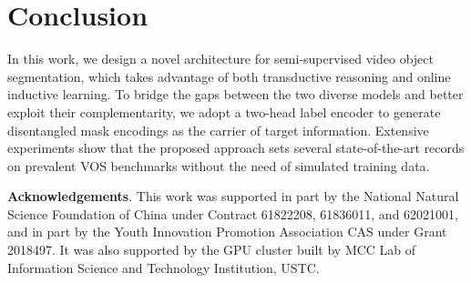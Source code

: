 \documentclass[10pt,twocolumn,letterpaper]{article}
\begin{document}
\section{Conclusion}
In this work, we design a novel architecture for semi-supervised video object segmentation, which takes advantage of both transductive reasoning and online inductive learning. To bridge the gaps between the two diverse models and better exploit their complementarity, we adopt a two-head label encoder to generate disentangled mask encodings as the carrier of target information. Extensive experiments show that the proposed approach sets several state-of-the-art records on prevalent VOS benchmarks without the need of simulated training data.

\footnotesize {\flushleft \bf Acknowledgements}. This work was supported in part by the National Natural Science Foundation of China under Contract 61822208, 61836011, and 62021001, and in part by the Youth Innovation Promotion Association CAS under Grant 2018497. It was also supported by the GPU cluster built by MCC Lab of Information Science and Technology Institution, USTC.

{\small


}
\end{document}
